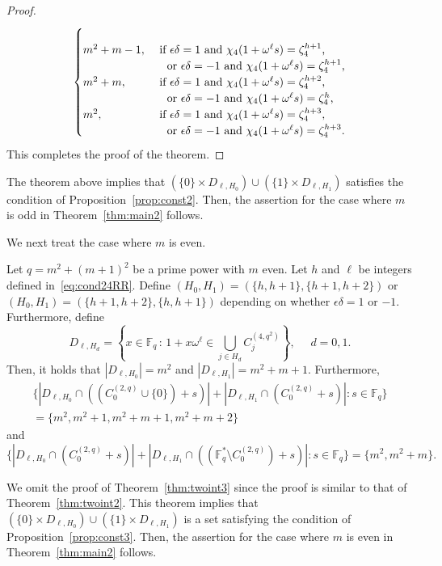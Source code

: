 \documentclass[ALCO,ThmDefs,Unicode]{cedram}
\newcommand*\F{{\mathbb F}}
\begin{document}
\begin{proof}
\begin{equation*}
\begin{cases}
\\
m^2+m-1,& \text{ if $\epsilon \delta=1$ and $\chi_4(1+\omega^\ell s)=\zeta_4^{h+1}$,}
\\
& \text{\quad or $\epsilon \delta=-1$ and $\chi_4(1+\omega^\ell s)=\zeta_4^{h+1}$,}
\\
m^2+m,& \text{ if $\epsilon \delta=1$ and $\chi_4(1+\omega^\ell s)=\zeta_4^{h+2}$,}
\\
& \text{\quad or $\epsilon \delta=-1$ and $\chi_4(1+\omega^\ell s)=\zeta_4^{h}$,}
\\
m^2,& \text{ if $\epsilon \delta=1$ and $\chi_4(1+\omega^\ell s)=\zeta_4^{h+3}$,}
\\
& \text{\quad or $\epsilon \delta=-1$ and $\chi_4(1+\omega^\ell s)=\zeta_4^{h+3}$.}
\end{cases}
\end{equation*}
This completes the proof of the theorem.
\end{proof}


The theorem above implies that $(\{0\}\times D_{\ell,H_0}) \cup (\{1\}\times D_{\ell,H_1})$ satisfies the condition of Proposition~\ref{prop:const2}. Then, the assertion for the case where $m$ is odd in Theorem~\ref{thm:main2} follows.

We next treat the case where $m$ is even.


\begin{theo}\label{thm:twoint3}
Let $q=m^2+(m+1)^2$ be a prime power with $m$ even. Let $h$ and $\ell$ be integers defined in~\eqref{eq:cond24RR}. Define $(H_0,H_1)=(\{h,h+1\},\{h+1,h+2\})$ or $(H_0,H_1)=(\{h+1,h+2\},\{h,h+1\})$ depending on whether $\epsilon \delta=1$ or $-1$. Furthermore, define
\[
D_{\ell,H_d}=\left\{x\in \F_q\,:\, 1+x\omega^\ell\in \bigcup_{j\in H_d}C_j^{(4,q^2)} \right\}, \quad \, \, d=0,1.
\]
Then, it holds that $|D_{\ell,H_0}|=m^2$ and $|D_{\ell,H_1}|=m^2+m+1$. Furthermore,
\begin{multline*}
\{|D_{\ell,H_0}\cap ((C_0^{(2,q)}\cup \{0\})+s)|+|D_{\ell,H_1}\cap (C_0^{(2,q)}+s)|:s\in \F_q\}\\
=\{m^2,m^2+1,m^2+m+1,m^2+m+2\}
\end{multline*}
and
\[
\{|D_{\ell,H_0}\cap (C_0^{(2,q)}+s)|+|D_{\ell,H_1}\cap ((\F_q^\ast\setminus C_0^{(2,q)})+s)|:s\in \F_q\}= \{m^2,m^2+m\}.
\]
\end{theo}

We omit the proof of Theorem~\ref{thm:twoint3} since the proof is similar to that of Theorem~\ref{thm:twoint2}. This theorem implies that $(\{0\}\times D_{\ell,H_0}) \cup (\{1\}\times D_{\ell,H_1})$ is a set satisfying the condition of Proposition~\ref{prop:const3}. Then, the assertion for the case where $m$ is even in Theorem~\ref{thm:main2} follows.
\end{document}
